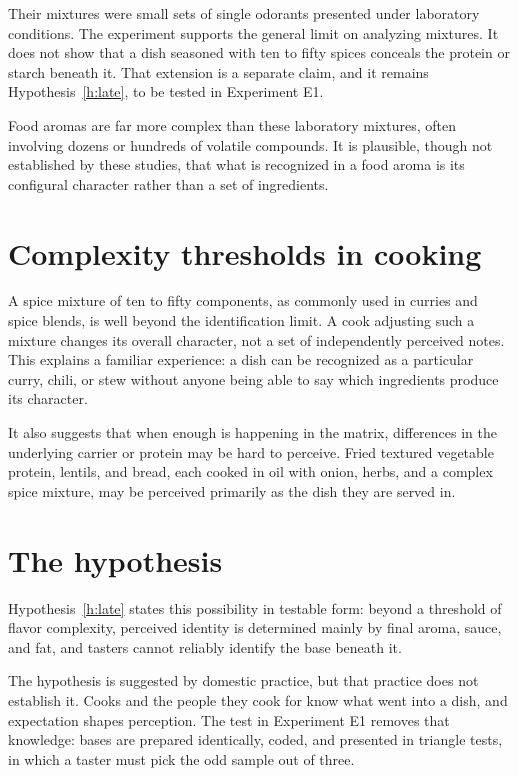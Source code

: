 \documentclass[11pt,openany]{book}
\theoremstyle{definition}
\begin{document}
Their mixtures were small sets of single odorants presented under laboratory conditions. The experiment supports the general limit on analyzing mixtures. It does not show that a dish seasoned with ten to fifty spices conceals the protein or starch beneath it. That extension is a separate claim, and it remains Hypothesis~\ref{h:late}, to be tested in Experiment E1.

Food aromas are far more complex than these laboratory mixtures, often involving dozens or hundreds of volatile compounds. It is plausible, though not established by these studies, that what is recognized in a food aroma is its configural character rather than a set of ingredients.

\section{Complexity thresholds in cooking}

A spice mixture of ten to fifty components, as commonly used in curries and spice blends, is well beyond the identification limit. A cook adjusting such a mixture changes its overall character, not a set of independently perceived notes. This explains a familiar experience: a dish can be recognized as a particular curry, chili, or stew without anyone being able to say which ingredients produce its character.

It also suggests that when enough is happening in the matrix, differences in the underlying carrier or protein may be hard to perceive. Fried textured vegetable protein, lentils, and bread, each cooked in oil with onion, herbs, and a complex spice mixture, may be perceived primarily as the dish they are served in.

\section{The hypothesis}

Hypothesis~\ref{h:late} states this possibility in testable form: beyond a threshold of flavor complexity, perceived identity is determined mainly by final aroma, sauce, and fat, and tasters cannot reliably identify the base beneath it.

The hypothesis is suggested by domestic practice, but that practice does not establish it. Cooks and the people they cook for know what went into a dish, and expectation shapes perception. The test in Experiment E1 removes that knowledge: bases are prepared identically, coded, and presented in triangle tests, in which a taster must pick the odd sample out of three.
\end{document}
